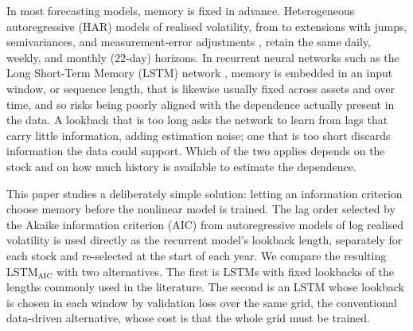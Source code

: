 \documentclass[12pt]{article}
\begin{document}
In most forecasting models, memory is fixed in advance. Heterogeneous autoregressive (HAR) models of realised volatility, from \textcite{corsi-2008} to extensions with jumps, semivariances, and measurement-error adjustments \parencite{anderson-2007,patton-2015,bollerslev-2016}, retain the same daily, weekly, and monthly (22-day) horizons. In recurrent neural networks such as the Long Short-Term Memory (LSTM) network \parencite{hochreiter-1997}, memory is embedded in an input window, or sequence length, that is likewise usually fixed across assets and over time, and so risks being poorly aligned with the dependence actually present in the data. A lookback that is too long asks the network to learn from lags that carry little information, adding estimation noise; one that is too short discards information the data could support. Which of the two applies depends on the stock and on how much history is available to estimate the dependence.

This paper studies a deliberately simple solution: letting an information criterion choose memory before the nonlinear model is trained. The lag order selected by the Akaike information criterion (AIC) from autoregressive models of log realised volatility is used directly as the recurrent model's lookback length, separately for each stock and re-selected at the start of each year. We compare the resulting LSTM$_{\mathrm{AIC}}$ with two alternatives. The first is LSTMs with fixed lookbacks of the lengths commonly used in the literature. The second is an LSTM whose lookback is chosen in each window by validation loss over the same grid, the conventional data-driven alternative, whose cost is that the whole grid must be trained.
\end{document}
